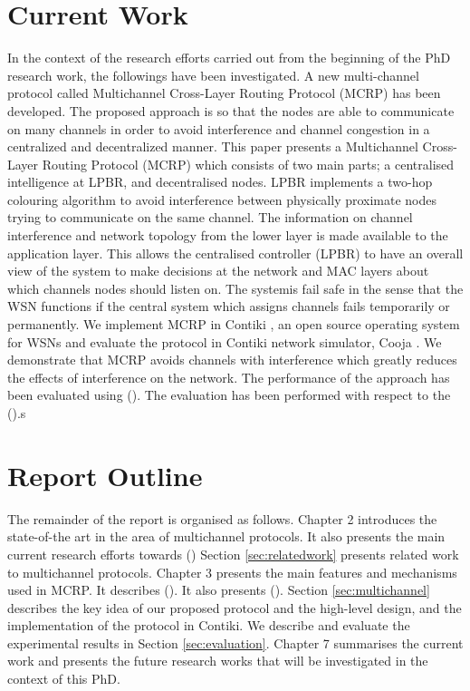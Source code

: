 \section{Current Work}
In the context of the research efforts carried out from the beginning of the PhD research work, the followings have been investigated.
A new multi-channel protocol called Multichannel Cross-Layer Routing Protocol (MCRP) has been developed. The proposed approach is so that the nodes are able to communicate on many channels in order to avoid interference and channel congestion in a centralized and decentralized manner.
This paper presents a Multichannel Cross-Layer Routing Protocol (MCRP) which consists of two main parts; a centralised intelligence at LPBR, and decentralised nodes. LPBR implements a two-hop colouring algorithm to avoid interference between physically proximate nodes trying to communicate on the same channel. The information on channel interference and network topology from the lower layer is made available to the application layer. This allows the centralised controller (LPBR) to have an overall view of the system to make decisions at the network and MAC layers about which channels nodes should listen on. The systemis fail safe in the sense that the WSN functions if the central system which assigns channels fails temporarily or permanently. We implement MCRP in Contiki \cite{contiki}, an open source operating system for WSNs and evaluate the protocol in Contiki network simulator, Cooja \cite{cooja}. 
We demonstrate that MCRP avoids channels with interference which greatly reduces the effects of interference on the network.
The performance of the approach has been evaluated using (). The evaluation has been performed with respect to the ().s

\section{Report Outline}
The remainder of the report is organised as follows. Chapter 2 introduces the state-of-the art in the area of multichannel protocols. It also presents the main current research efforts towards () Section \ref{sec:relatedwork} presents related work to multichannel protocols. Chapter 3 presents the main features and mechanisms used in MCRP. It describes (). It also presents (). Section \ref{sec:multichannel} describes the key idea of our proposed protocol and the high-level design, and the implementation of the protocol in Contiki. We describe and evaluate the experimental results in Section \ref{sec:evaluation}. Chapter 7 summarises the current work and presents the future research works that will be investigated in the context of this PhD.